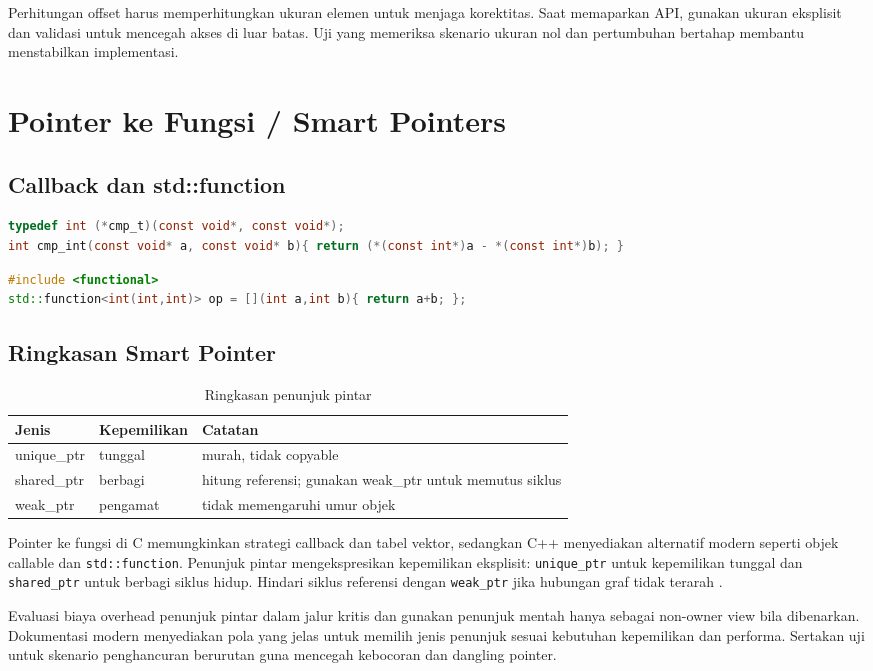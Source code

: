 \documentclass[../main.tex]{subfiles}
\begin{document}
Perhitungan offset harus memperhitungkan ukuran elemen untuk menjaga korektitas. Saat memaparkan API, gunakan ukuran eksplisit dan validasi untuk mencegah akses di luar batas. Uji yang memeriksa skenario ukuran nol dan pertumbuhan bertahap membantu menstabilkan implementasi.

\section{Pointer ke Fungsi / Smart Pointers}
\subsection{Callback dan std::function}
\begin{lstlisting}[language=C, caption={Pointer ke fungsi di C}]
typedef int (*cmp_t)(const void*, const void*);
int cmp_int(const void* a, const void* b){ return (*(const int*)a - *(const int*)b); }
\end{lstlisting}

\begin{lstlisting}[language=C++, caption={std::function dan lambda di C++}]
#include <functional>
std::function<int(int,int)> op = [](int a,int b){ return a+b; };
\end{lstlisting}

\subsection{Ringkasan Smart Pointer}
\begin{table}[h]
  \centering
  \caption{Ringkasan penunjuk pintar}
  \begin{tabular}{@{}lll@{}}
    \toprule
    Jenis & Kepemilikan & Catatan \\
    \midrule
    unique\_ptr & tunggal & murah, tidak copyable \\
    shared\_ptr & berbagi & hitung referensi; gunakan weak\_ptr untuk memutus siklus \\
    weak\_ptr & pengamat & tidak memengaruhi umur objek \\
    \bottomrule
  \end{tabular}
\end{table}
Pointer ke fungsi di C memungkinkan strategi callback dan tabel vektor, sedangkan C++ menyediakan alternatif modern seperti objek callable dan \texttt{std::function}. Penunjuk pintar mengekspresikan kepemilikan eksplisit: \texttt{unique\_ptr} untuk kepemilikan tunggal dan \texttt{shared\_ptr} untuk berbagi siklus hidup. Hindari siklus referensi dengan \texttt{weak\_ptr} jika hubungan graf tidak terarah \parencite{cpp-reference}.

Evaluasi biaya overhead penunjuk pintar dalam jalur kritis dan gunakan penunjuk mentah hanya sebagai non-owner view bila dibenarkan. Dokumentasi modern menyediakan pola yang jelas untuk memilih jenis penunjuk sesuai kebutuhan kepemilikan dan performa. Sertakan uji untuk skenario penghancuran berurutan guna mencegah kebocoran dan dangling pointer.
\end{document}
